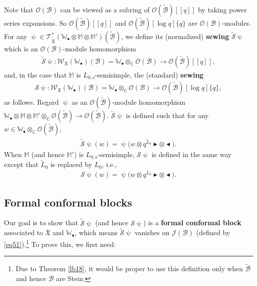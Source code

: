 \documentclass[12pt,a4paper,notitlepage]{article}
\theoremstyle{definition}
\theoremstyle{plain}
\newcommand{\fk}{\mathfrak}
\newcommand{\mc}{\mathcal}
\newcommand{\wtd}{\widetilde}
\newcommand{\scr}{\mathscr}
\newcommand{\blt}{\bullet}
\newcommand{\Wbb}{\mathbb W}
\newcommand{\Mbb}{\mathbb M}
\newcommand{\Cbb}{\mathbb C}
\newcommand{\btl}{\blacktriangleleft}
\newcommand{\btr}{\blacktriangleright}
\newcommand{\Lss}{{L_{0,\mathrm{s}}}}
\numberwithin{equation}{section}
\begin{document}
Note that $\scr O(\mc B)$ can be viewed as a subring of $\scr O(\wtd{\mc B})[[q]]$ by taking power series expansions. So $\scr O(\wtd{\mc B})[[q]]$ and $\scr O(\wtd{\mc B})[\log q]\{q\}$ are $\scr O(\mc B)$-modules.  For any $\uppsi\in\scr T_{\wtd{\fk X}}^*(\Wbb_\blt\otimes\Mbb\otimes\Mbb')(\wtd{\mc B})$, we define its (normalized) \textbf{sewing} $\wtd{\mc S}\uppsi$ which is an $\scr O(\mc B)$-module homomorphism \index{S@$\wtd{\mc S}\uppsi,\mc S\uppsi$}
\begin{align*}
\wtd{\mc S}\uppsi:\scr W_{\fk X}(\Wbb_\blt)(\mc B)=\Wbb_\blt\otimes_\Cbb\scr O(\mc B)\rightarrow\scr O(\wtd{\mc B})[[q]],
\end{align*}
and, in the case that $\Mbb$ is $\Lss$-semisimple, the (standard) \textbf{sewing}
\begin{align*}
\mc S\uppsi:\scr W_{\fk X}(\Wbb_\blt)(\mc B)=\Wbb_\blt\otimes_\Cbb\scr O(\mc B)\rightarrow\scr O(\wtd{\mc B})[\log q]\{q\},
\end{align*}
as follows. Regard $\uppsi$ as an $\scr O(\wtd{\mc B})$-module homomorphism $\Wbb_\blt\otimes\Mbb\otimes\Mbb'\otimes_\Cbb\scr O(\wtd{\mc B})\rightarrow \scr O(\wtd{\mc B})$. $\wtd{\mc S}\uppsi$ is defined such that for any  $w\in\Wbb_\blt\otimes_\Cbb\scr O(\wtd{\mc B})$,
\begin{align}
\wtd{\mc S}\uppsi(w)=\uppsi\big(w\otimes q^{\wtd L_0}\btr\otimes\btl\big).
\end{align}
When $\Mbb$ (and hence $\Mbb'$) is $\Lss$-semisimple, $\mc S\uppsi$ is defined in the same way except that $\wtd L_0$ is replaced by $L_0$, i.e.,
\begin{align}
{\mc S}\uppsi(w)=\uppsi\big(w\otimes q^{L_0}\btr\otimes\btl\big).\label{eq105}
\end{align}



\subsection*{Formal conformal blocks}

Our goal is to show that $\wtd{\mc S}\uppsi$ (and hence $\mc S\uppsi$) is a \textbf{formal conformal block} associated to $\fk X$ and $\Wbb_\blt$, which means $\wtd{\mc S}\uppsi$ vanishes on $\scr J(\mc B)$ (defined by \eqref{eq51}).\footnote{Due to Theorem \ref{lb18}, it would be proper to use this definition only when $\wtd{\mc B}$ and hence $\mc B$ are Stein.} To prove this, we first need:
\end{document}
